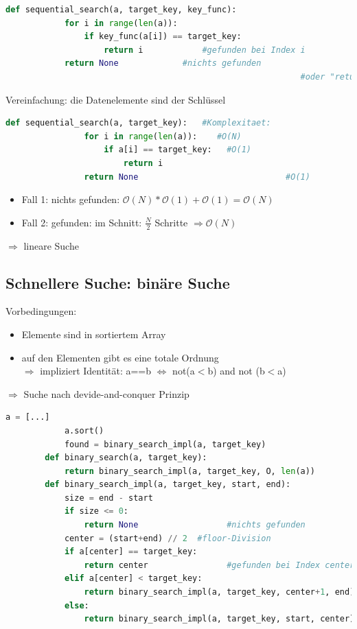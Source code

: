 \documentclass[11pt, fleqn]{scrreprt}
\begin{document}
\begin{lstlisting}[language=Python]
		def sequential_search(a, target_key, key_func):
			for i in range(len(a)):
				if key_func(a[i]) == target_key:
					return i            #gefunden bei Index i
			return None             #nichts gefunden
															#oder "return -1"
	\end{lstlisting}
	
	Vereinfachung: die Datenelemente sind der Schlüssel
	
	\begin{lstlisting}[language=Python]
			def sequential_search(a, target_key):   #Komplexitaet:
				for i in range(len(a)):    #O(N)
					if a[i] == target_key:   #O(1)
						return i
				return None								 #O(1)
		\end{lstlisting}
		\begin{itemize}
			\item Fall 1: nichts gefunden: $\mathcal{O}(N) * \mathcal{O}(1) + \mathcal{O}(1) = \mathcal{O}(N)$
			\item Fall 2: gefunden: im Schnitt: $\frac{N}{2}$ Schritte $\Rightarrow \mathcal{O}(N)$
		\end{itemize}
		$\Rightarrow$ \glqq lineare Suche\grqq
		
		\subsection*{Schnellere Suche: binäre Suche}
		Vorbedingungen: 
		\begin{itemize}
			\item Elemente sind in sortiertem Array
			\item auf den Elementen gibt es eine totale Ordnung \\
			$\Rightarrow$ impliziert Identität: a==b $\Leftrightarrow$ not(a$<$b) and not (b$<$a)
		\end{itemize}
		
		$\Rightarrow$ Suche nach devide-and-conquer Prinzip\\
		\begin{lstlisting}[language=Python]
			a = [...]
			a.sort()
			found = binary_search_impl(a, target_key)
		def binary_search(a, target_key):
			return binary_search_impl(a, target_key, O, len(a))
		def binary_search_impl(a, target_key, start, end):
			size = end - start
			if size <= 0:
				return None         		 #nichts gefunden
			center = (start+end) // 2  #floor-Division
			if a[center] == target_key:
				return center      			 #gefunden bei Index center
			elif a[center] < target_key:
				return binary_search_impl(a, target_key, center+1, end)
			else:
				return binary_search_impl(a, target_key, start, center)
		\end{lstlisting}
		
\end{document}
